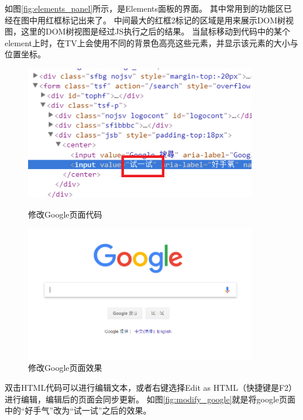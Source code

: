 如图\ref{fig:elements_panel}所示，是Elements面板的界面。
其中常用到的功能区已经在图中用红框标记出来了。
中间最大的红框2标记的区域是用来展示DOM树视图，这里的DOM树视图是经过JS执行之后的结果。
当鼠标移动到代码中的某个element上时，在TV上会使用不同的背景色高亮这些元素，并显示该元素的大小与位置坐标。

\begin{figure}[H] 
\centering 
\begin{minipage}[t]{0.45\textwidth}
\includegraphics[width=0.9\textwidth]{image/devtools_study/elements_edit_code.png} 
\caption{修改Google页面代码}
\end{minipage}
\begin{minipage}[t]{0.45\textwidth}
\includegraphics[width=0.9\textwidth]{image/devtools_study/elements_edit_result.png} 
\caption{修改Google页面效果}
\end{minipage}
\end{figure}

双击HTML代码可以进行编辑文本，或者右键选择Edit as HTML（快捷键是F2）进行编辑，编辑后的页面会同步更新。
如图\ref{fig:modify_google}就是将google页面中的“好手气”改为“试一试”之后的效果。

